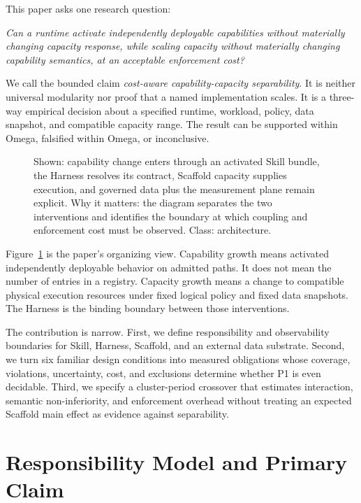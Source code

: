 This paper asks one research question:

\textit{Can a runtime activate independently deployable capabilities without materially changing capacity response, while scaling capacity without materially changing capability semantics, at an acceptable enforcement cost?}

We call the bounded claim \textit{cost-aware capability-capacity separability}. It is neither universal modularity nor proof that a named implementation scales. It is a three-way empirical decision about a specified runtime, workload, policy, data snapshot, and compatible capacity range. The result can be supported within Omega, falsified within Omega, or inconclusive.

\begin{figure}[t]
\centering
\caption{Shown: capability change enters through an activated Skill bundle, the Harness resolves its contract, Scaffold capacity supplies execution, and governed data plus the measurement plane remain explicit. Why it matters: the diagram separates the two interventions and identifies the boundary at which coupling and enforcement cost must be observed. Class: architecture.}
\label{fig:dual-scaling}
\end{figure}

Figure~\ref{fig:dual-scaling} is the paper's organizing view. Capability growth means activated independently deployable behavior on admitted paths. It does not mean the number of entries in a registry. Capacity growth means a change to compatible physical execution resources under fixed logical policy and fixed data snapshots. The Harness is the binding boundary between those interventions.

The contribution is narrow. First, we define responsibility and observability boundaries for Skill, Harness, Scaffold, and an external data substrate. Second, we turn six familiar design conditions into measured obligations whose coverage, violations, uncertainty, cost, and exclusions determine whether P1 is even decidable. Third, we specify a cluster-period crossover that estimates interaction, semantic non-inferiority, and enforcement overhead without treating an expected Scaffold main effect as evidence against separability.

\section{Responsibility Model and Primary Claim}
\label{sec:model}

